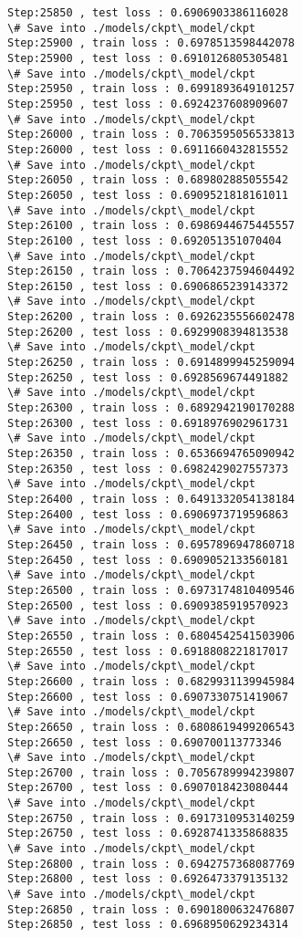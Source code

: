 \documentclass[11pt]{article}
\begin{document}
\begin{Verbatim}[commandchars=\\\{\}]
Step:25850 , test loss : 0.6906903386116028
\# Save into ./models/ckpt\_model/ckpt
Step:25900 , train loss : 0.6978513598442078
Step:25900 , test loss : 0.6910126805305481
\# Save into ./models/ckpt\_model/ckpt
Step:25950 , train loss : 0.6991893649101257
Step:25950 , test loss : 0.6924237608909607
\# Save into ./models/ckpt\_model/ckpt
Step:26000 , train loss : 0.7063595056533813
Step:26000 , test loss : 0.6911660432815552
\# Save into ./models/ckpt\_model/ckpt
Step:26050 , train loss : 0.689802885055542
Step:26050 , test loss : 0.6909521818161011
\# Save into ./models/ckpt\_model/ckpt
Step:26100 , train loss : 0.6986944675445557
Step:26100 , test loss : 0.692051351070404
\# Save into ./models/ckpt\_model/ckpt
Step:26150 , train loss : 0.7064237594604492
Step:26150 , test loss : 0.6906865239143372
\# Save into ./models/ckpt\_model/ckpt
Step:26200 , train loss : 0.6926235556602478
Step:26200 , test loss : 0.6929908394813538
\# Save into ./models/ckpt\_model/ckpt
Step:26250 , train loss : 0.6914899945259094
Step:26250 , test loss : 0.6928569674491882
\# Save into ./models/ckpt\_model/ckpt
Step:26300 , train loss : 0.6892942190170288
Step:26300 , test loss : 0.6918976902961731
\# Save into ./models/ckpt\_model/ckpt
Step:26350 , train loss : 0.6536694765090942
Step:26350 , test loss : 0.6982429027557373
\# Save into ./models/ckpt\_model/ckpt
Step:26400 , train loss : 0.6491332054138184
Step:26400 , test loss : 0.6906973719596863
\# Save into ./models/ckpt\_model/ckpt
Step:26450 , train loss : 0.6957896947860718
Step:26450 , test loss : 0.6909052133560181
\# Save into ./models/ckpt\_model/ckpt
Step:26500 , train loss : 0.6973174810409546
Step:26500 , test loss : 0.6909385919570923
\# Save into ./models/ckpt\_model/ckpt
Step:26550 , train loss : 0.6804542541503906
Step:26550 , test loss : 0.6918808221817017
\# Save into ./models/ckpt\_model/ckpt
Step:26600 , train loss : 0.6829931139945984
Step:26600 , test loss : 0.6907330751419067
\# Save into ./models/ckpt\_model/ckpt
Step:26650 , train loss : 0.6808619499206543
Step:26650 , test loss : 0.690700113773346
\# Save into ./models/ckpt\_model/ckpt
Step:26700 , train loss : 0.7056789994239807
Step:26700 , test loss : 0.6907018423080444
\# Save into ./models/ckpt\_model/ckpt
Step:26750 , train loss : 0.6917310953140259
Step:26750 , test loss : 0.6928741335868835
\# Save into ./models/ckpt\_model/ckpt
Step:26800 , train loss : 0.6942757368087769
Step:26800 , test loss : 0.6926473379135132
\# Save into ./models/ckpt\_model/ckpt
Step:26850 , train loss : 0.6901800632476807
Step:26850 , test loss : 0.6968950629234314

\end{Verbatim}
\end{document}
